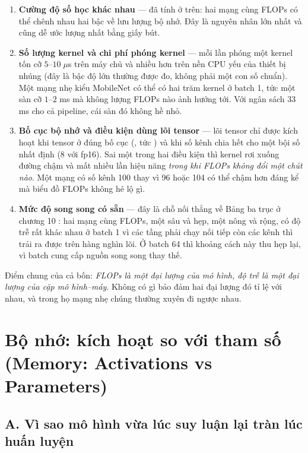 \documentclass[../../deep_learning.tex]{subfiles}
\begin{document}
\begin{enumerate}
\item \textbf{Cường độ số học khác nhau} --- đã tính ở trên: hai mạng cùng FLOPs có thể chênh nhau hai bậc về lưu lượng bộ nhớ. Đây là nguyên nhân lớn nhất và cũng dễ ước lượng nhất bằng giấy bút.
\item \textbf{Số lượng kernel và chi phí phóng kernel} --- mỗi lần phóng một kernel tốn cỡ \(5\)--\(10\;\mu\)s trên máy chủ và nhiều hơn trên nền CPU yếu của thiết bị nhúng (đây là bậc độ lớn thường được đo, không phải một con số chuẩn). Một mạng nhẹ kiểu MobileNet có thể có hai trăm kernel ở batch 1, tức một sàn cỡ \(1\)--\(2\) ms mà không lượng FLOPs nào ảnh hưởng tới. Với ngân sách 33 ms cho cả pipeline, cái sàn đó không hề nhỏ.
\item \textbf{Bố cục bộ nhớ và điều kiện dùng lõi tensor} --- lõi tensor chỉ được kích hoạt khi tensor ở đúng bố cục (, tức ) và khi số kênh chia hết cho một bội số nhất định (8 với fp16). Sai một trong hai điều kiện thì kernel rơi xuống đường chậm và mất nhiều lần hiệu năng \emph{trong khi FLOPs không đổi một chút nào}. Một mạng có số kênh 100 thay vì 96 hoặc 104 có thể chậm hơn đáng kể mà biểu đồ FLOPs không hé lộ gì.
\item \textbf{Mức độ song song có sẵn} --- đây là chỗ nối thẳng về Bảng ba trục ở chương 10 : hai mạng cùng FLOPs, một sâu và hẹp, một nông và rộng, có độ trễ rất khác nhau ở batch 1 vì các tầng phải chạy nối tiếp còn các kênh thì trải ra được trên hàng nghìn lõi. Ở batch 64 thì khoảng cách này thu hẹp lại, vì batch cung cấp nguồn song song thay thế.
\end{enumerate}

Điểm chung của cả bốn: \emph{FLOPs là một đại lượng của mô hình, độ trễ là một đại lượng của cặp mô hình--máy}. Không có gì bảo đảm hai đại lượng đó tỉ lệ với nhau, và trong họ mạng nhẹ chúng thường xuyên đi ngược nhau.

\section{Bộ nhớ: kích hoạt so với tham số (Memory: Activations vs Parameters)}

\subsection{A. Vì sao mô hình vừa lúc suy luận lại tràn lúc huấn luyện}
\end{document}
